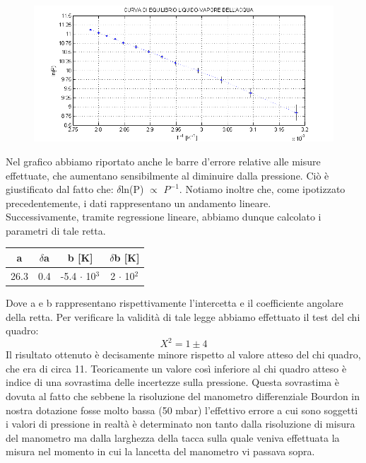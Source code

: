 \documentclass[11pt]{article}
\begin{document}
\begin{figure}[H]
\hspace{-38mm}
\includegraphics[scale=1.10]{pressione_temperatura.png}
\end{figure}

Nel grafico abbiamo riportato anche le barre d'errore relative alle misure effettuate, che aumentano sensibilmente al diminuire dalla pressione. Ciò è giustificato dal fatto che: $\delta$ln(P) $\propto$ $P^{-1}$. Notiamo inoltre che, come ipotizzato precedentemente, i dati rappresentano un andamento lineare.\\
Successivamente, tramite regressione lineare, abbiamo dunque calcolato i parametri di tale retta. 
\begin{center}
\begin{tabular}{|c|c|c|c|}
\hline
a & $\delta$a & b [\unit{K}] & $\delta$b [\unit{K}]\\
\hline
 26.3 & 0.4 & -5.4 $\cdot$ 10$^{3}$ & 2 $\cdot$ 10$^{2}$ \\
\hline
\end{tabular}
\end{center}
Dove a e b rappresentano rispettivamente l'intercetta e il coefficiente angolare della retta. Per verificare la validità di tale legge abbiamo effettuato il test del chi quadro:
\begin{equation}
X^2 = 1 \pm 4
\end{equation}
Il risultato ottenuto è decisamente minore rispetto al valore atteso del chi quadro, che era di circa 11. Teoricamente un valore così inferiore al chi quadro atteso è indice di una sovrastima delle incertezze sulla pressione. Questa sovrastima è dovuta al fatto che sebbene la risoluzione del manometro differenziale Bourdon in  nostra dotazione fosse molto bassa (50 \unit{mbar}) l'effettivo errore a cui sono soggetti i valori di pressione in realtà è determinato non tanto dalla risoluzione di misura del manometro ma dalla larghezza della tacca  sulla quale veniva effettuata la misura nel momento in cui la lancetta del manometro vi passava sopra. %
\end{document}
